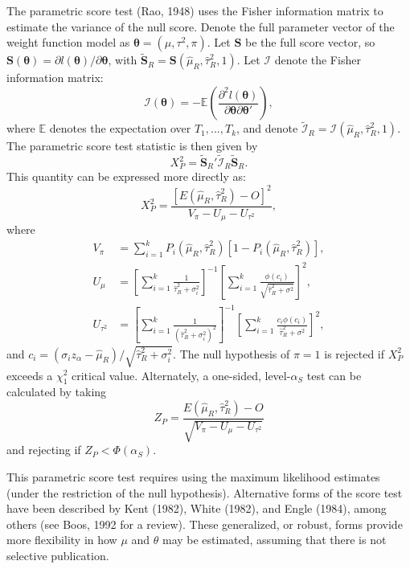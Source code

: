 \documentclass[man,floatsintext]{apa6}
\begin{document}
The parametric score test (Rao, 1948) uses the Fisher information matrix to estimate the variance of the null score. Denote the full parameter vector of the weight function model as \(\boldsymbol\theta = (\mu, \tau^2, \pi)\). Let \(\bm{S}\) be the full score vector, so \(\bm{S}(\boldsymbol\theta) = \partial l(\boldsymbol\theta) / \partial \boldsymbol\theta\), with \(\bm{\tilde{S}}_R = \bm{S}(\hat\mu_R, \hat\tau^2_R, 1)\). Let \(\mathcal{I}\) denote the Fisher information matrix:
\[
\mathcal{I}(\boldsymbol\theta) = - \mathbb{E}\left(\frac{\partial^2 l(\boldsymbol\theta)}{\partial \boldsymbol\theta \partial \boldsymbol\theta'} \right),
\]
where \(\mathbb{E}\) denotes the expectation over \(T_1,...,T_k\), and denote \(\tilde{\mathcal{I}}_R = \mathcal{I}(\hat\mu_R, \hat\tau^2_R, 1)\). The parametric score test statistic is then given by
\[
X^2_P = \bm{\tilde{S}}_R'\tilde{\mathcal{I}}_R \bm{\tilde{S}}_R.
\]
This quantity can be expressed more directly as:
\begin{equation}
X^2_P = \frac{\left[E(\hat\mu_R, \hat\tau^2_R) - O\right]^2}{V_\pi - U_\mu - U_{\tau^2}},
\label{eq:parametric-score}
\end{equation}
where
\[
\begin{aligned}
V_\pi &= \sum_{i=1}^k P_i(\hat\mu_R, \hat\tau^2_R) \left[1 - P_i(\hat\mu_R, \hat\tau^2_R)\right], \\
U_\mu &= \left[\sum_{i=1}^k \frac{1}{\hat\tau_R^2 + \sigma_i^2}\right]^{-1}\left[\sum_{i=1}^k \frac{\phi(c_i)}{\sqrt{\hat\tau^2_R + \sigma^2}}\right]^2, \\
U_{\tau^2} &= \left[\sum_{i=1}^k \frac{1}{\left(\hat\tau_R^2 + \sigma_i^2\right)^2}\right]^{-1}\left[\sum_{i=1}^k \frac{c_i\phi(c_i)}{\hat\tau^2_R + \sigma^2}\right]^2,
\end{aligned}
\]
and \(c_i = \left(\sigma_i z_\alpha - \hat\mu_R\right) / \sqrt{\hat\tau^2_R + \sigma_i^2}\).
The null hypothesis of \(\pi = 1\) is rejected if \(X^2_P\) exceeds a \(\chi^2_1\) critical value.
Alternately, a one-sided, level-\(\alpha_S\) test can be calculated by taking
\begin{equation}
Z_P = \frac{E(\hat\mu_R, \hat\tau^2_R) - O}{\sqrt{V_\pi - U_\mu - U_{\tau^2}}}
\end{equation}
and rejecting if \(Z_P < \Phi(\alpha_S)\).

This parametric score test requires using the maximum likelihood estimates (under the restriction of the null hypothesis). Alternative forms of the score test have been described by Kent (1982), White (1982), and Engle (1984), among others (see Boos, 1992 for a review).
These generalized, or robust, forms provide more flexibility in how \(\mu\) and \(\theta\) may be estimated, assuming that there is not selective publication.
\end{document}
